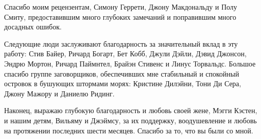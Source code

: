 Спасибо моим рецензентам, Симону Геррети, Джону Макдональду и Полу
Смиту, предоставившим много глубоких замечаний и поправившим много
досадных ошибок.

Следующие люди заслуживают благодарность за значительный вклад в эту
работу: Стив Байер, Ричард Богарт, Бет Кобб, Джули Дэйли, Дэвид
Джонсон, Эндрю Мортон, Ричард Паймнтел, Брайэн Стивенс и Линус
Торвальдс.  Большое спасибо группе заговорщиков, обеспечивших мне
стабильный и спокойный островок в бушующих штормами морях: Кристине
Дилэйни, Тони Ди Сера, Джону Мажору и Даниелю Ридинг.

Наконец, выражаю глубокую благодарность и любовь своей жене, Мэгги
Кэстен, и нашим детям, Вильяму и Джэймсу, за их поддержку,
воодушевление и любовь на протяжении последних шести месяцев.  Спасибо
за то, что вы были со мной.
